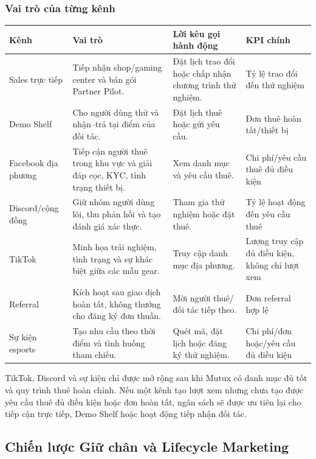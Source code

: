 \subsubsection{Vai trò của từng kênh}

\begin{longtable}{@{}p{}p{}p{}p{}@{}}
\toprule
\textbf{Kênh} & \textbf{Vai trò} & \textbf{Lời kêu gọi hành động} & \textbf{KPI chính} \\
\midrule
\endhead
Sales trực tiếp & Tiếp nhận shop/gaming center và bán gói Partner Pilot. & Đặt lịch trao đổi hoặc chấp nhận chương trình thử nghiệm. & Tỷ lệ trao đổi đến thử nghiệm \\
Demo Shelf & Cho người dùng thử và nhận--trả tại điểm của đối tác. & Đặt lịch thuê hoặc gửi yêu cầu. & Đơn thuê hoàn tất/thiết bị \\
Facebook địa phương & Tiếp cận người thuê trong khu vực và giải đáp cọc, KYC, tình trạng thiết bị. & Xem danh mục và yêu cầu thuê. & Chi phí/yêu cầu thuê đủ điều kiện \\
Discord/cộng đồng & Giữ nhóm người dùng lõi, thu phản hồi và tạo đánh giá xác thực. & Tham gia thử nghiệm hoặc đặt thuê. & Tỷ lệ hoạt động đến yêu cầu thuê \\
TikTok & Minh họa trải nghiệm, tình trạng và sự khác biệt giữa các mẫu gear. & Truy cập danh mục địa phương. & Lượng truy cập đủ điều kiện, không chỉ lượt xem \\
Referral & Kích hoạt sau giao dịch hoàn tất, không thưởng cho đăng ký đơn thuần. & Mời người thuê/đối tác tiếp theo. & Đơn referral hợp lệ \\
Sự kiện esports & Tạo nhu cầu theo thời điểm và tình huống tham chiếu. & Quét mã, đặt lịch hoặc đăng ký thử nghiệm. & Chi phí/đơn hoặc/yêu cầu đủ điều kiện \\
\bottomrule
\end{longtable}

TikTok, Discord và sự kiện chỉ được mở rộng sau khi Mutux có danh mục đủ tốt và quy trình thuê hoàn chỉnh. Nếu một kênh tạo lượt xem nhưng chưa tạo được yêu cầu thuê đủ điều kiện hoặc đơn hoàn tất, ngân sách sẽ được ưu tiên lại cho tiếp cận trực tiếp, Demo Shelf hoặc hoạt động tiếp nhận đối tác.

\subsection{Chiến lược Giữ chân và Lifecycle Marketing}


